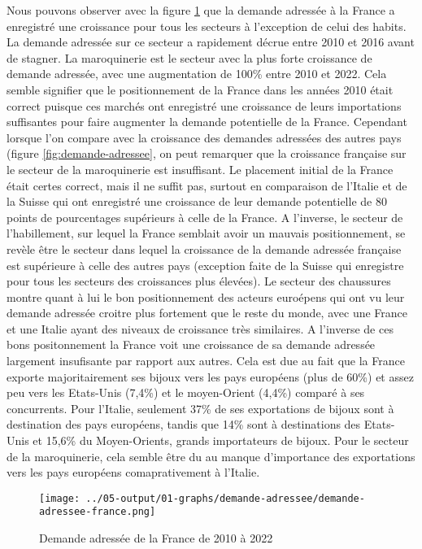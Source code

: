 \documentclass[french,10pt,a4paper]{article}
\begin{document}
Nous pouvons observer avec la figure \ref{fig:demande-adressee-france} que la demande adressée à la France a enregistré une croissance pour tous les secteurs à l'exception de celui des habits. La demande adressée sur ce secteur a rapidement décrue entre 2010 et 2016 avant de stagner. La maroquinerie est le secteur avec la plus forte croissance de demande adressée, avec une augmentation de 100\% entre 2010 et 2022. Cela semble signifier que le positionnement de la France dans les années 2010 était correct puisque ces marchés ont enregistré une croissance de leurs importations suffisantes pour faire augmenter la demande potentielle de la France. Cependant lorsque l'on compare avec la croissance des demandes adressées des autres pays (figure \ref{fig:demande-adressee}, on peut remarquer que la croissance française sur le secteur de la maroquinerie est insuffisant. Le placement initial de la France était certes correct, mais il ne suffit pas, surtout en comparaison de l'Italie et de la Suisse qui ont enregistré une croissance de leur demande potentielle de 80 points de pourcentages supérieurs à celle de la France. A l'inverse, le secteur de l'habillement, sur lequel la France semblait avoir un mauvais positionnement, se revèle être le secteur dans lequel la croissance de la demande adressée française est supérieure à celle des autres pays (exception faite de la Suisse qui enregistre pour tous les secteurs des croissances plus élevées). Le secteur des chaussures montre quant à lui le bon positionnement des acteurs euroépens qui ont vu leur demande adressée croitre plus fortement que le reste du monde, avec une France et une Italie ayant des niveaux de croissance très similaires. A l'inverse de ces bons positonnement la France voit une croissance de sa demande adressée largement insufisante par rapport aux autres. Cela est due au fait que la France exporte majoritairement ses bijoux vers les pays européens (plus de 60\%) et assez peu vers les Etats-Unis (7,4\%) et le moyen-Orient (4,4\%) comparé à ses concurrents. Pour l'Italie, seulement 37\% de ses exportations de bijoux sont à destination des pays européens, tandis que 14\% sont à destinations des Etats-Unis et 15,6\% du Moyen-Orients, grands importateurs de bijoux. Pour le secteur de la maroquinerie, cela semble être du au manque d'importance des exportations vers les pays européens comaprativement à l'Italie. 


\begin{figure}[!h]
  \centering  \texttt{[image: ../05-output/01-graphs/demande-adressee/demande-adressee-france.png]}
  \caption{Demande adressée de la France de 2010 à 2022}
  \label{fig:demande-adressee-france}
\end{figure}
\end{document}
